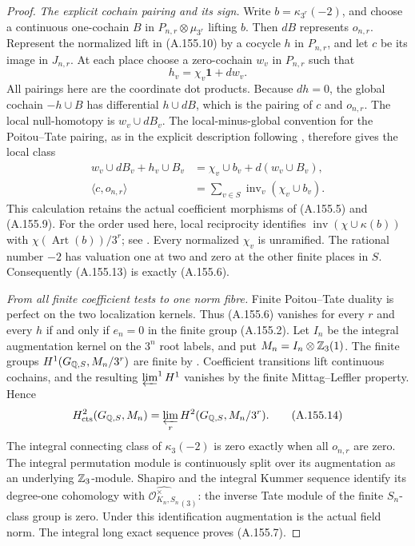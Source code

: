 \begin{proof}
\emph{The explicit cochain pairing and its sign.}
Write \(b=\kappa_{3^r}(-2)\), and choose a continuous one-cochain
\(B\) in \(P_{n,r}\otimes\mu_{3^r}\) lifting \(b\).
Then \(dB\) represents \(o_{n,r}\).
Represent the normalized lift in (A.155.10) by a cocycle \(h\)
in \(P_{n,r}\), and let \(c\) be its image in \(J_{n,r}\).
At each place choose a zero-cochain \(w_v\) in \(P_{n,r}\) such that
\[
                         h_v=\chi_v\mathbf1+dw_v.
\tag{A.155.12}
\]
All pairings here are the coordinate dot products.
Because \(dh=0\), the global cochain \(-h\cup B\) has differential
\(h\cup dB\), which is the pairing of \(c\) and \(o_{n,r}\).
The local null-homotopy is \(w_v\cup dB_v\).
The local-minus-global convention for the Poitou--Tate pairing,
as in the explicit description following
\cite[I, Remark 4.19]{BIR_MilneADT}, therefore gives the local class
\[
 \begin{aligned}
       w_v\cup dB_v+h_v\cup B_v
          &=\chi_v\cup b_v+d(w_v\cup B_v),\\
       \langle c,o_{n,r}\rangle
          &=\sum_{v\in S}\operatorname{inv}_v(\chi_v\cup b_v).
 \end{aligned}
\tag{A.155.13}
\]
This calculation retains the actual coefficient morphisms of
(A.155.5) and (A.155.9).
For the order used here, local reciprocity identifies
\(\operatorname{inv}(\chi\cup\kappa(b))\) with
\(\chi(\operatorname{Art}(b))/3^r\);
see \cite[III, Proposition 3.6 and Section 4, Steps 2--3]{MilneCFT}.
Every normalized \(\chi_v\) is unramified.
The rational number \(-2\) has valuation one at two and zero at
the other finite places in \(S\).
Consequently (A.155.13) is exactly (A.155.6).

\emph{From all finite coefficient tests to one norm fibre.}
Finite Poitou--Tate duality is perfect on the two localization kernels.
Thus (A.155.6) vanishes for every \(r\) and every \(h\) if and only
if \(e_n=0\) in the finite group (A.155.2).
Let \(I_n\) be the integral augmentation kernel on the \(3^n\)
root labels, and put \(M_n=I_n\otimes\mathbb Z_3(1)\).
The finite groups \(H^1(G_{\mathbb Q,S},M_n/3^r)\) are finite by
\cite[I, Corollary 4.15]{BIR_MilneADT}.
Coefficient transitions lift continuous cochains, and the resulting
\(\varprojlim^1H^1\) vanishes by the finite Mittag--Leffler property.
Hence
\[
 H^2_{\rm cts}(G_{\mathbb Q,S},M_n)
            =\varprojlim_r H^2(G_{\mathbb Q,S},M_n/3^r).
\tag{A.155.14}
\]
The integral connecting class of \(\kappa_3(-2)\) is zero exactly
when all \(o_{n,r}\) are zero.
The integral permutation module is continuously split over its
augmentation as an underlying \(\mathbb Z_3\)-module.
Shapiro and the integral Kummer sequence identify its degree-one
cohomology with
\(\widehat{\mathcal O_{K_n,S_n}^{\times}}_{(3)}\): the inverse Tate
module of the finite \(S_n\)-class group is zero.
Under this identification augmentation is the actual field norm.
The integral long exact sequence proves (A.155.7).


\end{proof}
